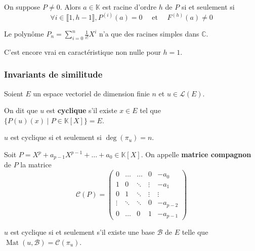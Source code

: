 	
	\begin{corollary}
		On suppose $P \neq 0$. Alors $a \in \mathbb{K}$ est racine d'ordre $h$ de $P$ si et seulement si
		\[ \forall i \in \llbracket 1, h-1 \rrbracket, P^{(i)}(a) = 0 \quad \text{ et } \quad F^{(h)}(a) \neq 0 \]
	\end{corollary}
	
	\begin{example}
		Le polynôme $P_n = \sum_{i=0}^{n} \frac{1}{i!} X^{i}$ n'a que des racines simples dans $\mathbb{C}$.
	\end{example}
	
	\begin{remark}
		C'est encore vrai en caractéristique non nulle pour $h = 1$.
	\end{remark}
	
	\subsubsection{Invariants de similitude}
	
	
	Soient $E$ un espace vectoriel de dimension finie $n$ et $u \in \mathcal{L}(E)$.
	
	\begin{definition}
		On dit que $u$ est \textbf{cyclique} s'il existe $x \in E$ tel que $\{ P(u)(x) \mid P \in \mathbb{K}[X] \} = E$.
	\end{definition}
	
	\begin{proposition}
		$u$ est cyclique si et seulement si $\deg(\pi_u) = n$.
	\end{proposition}
	
	\begin{definition}
		Soit $P = X^p + a_{p-1} X^{p-1} + \dots + a_0 \in \mathbb{K}[X]$. On appelle \textbf{matrice compagnon} de $P$ la matrice
		\[ \mathcal{C}(P) = \begin{pmatrix} 0 & \dots & \dots & 0 & -a_0 \\ 1 & 0 & \ddots & \vdots & -a_1 \\ 0 & 1 & \ddots & \vdots & \vdots \\ \vdots & \ddots & \ddots & 0 & -a_{p-2} \\ 0 & \dots & 0 & 1 & -a_{p-1} \end{pmatrix} \]
	\end{definition}
	
	\begin{proposition}
		$u$ est cyclique si et seulement s'il existe une base $\mathcal{B}$ de $E$ telle que $\operatorname{Mat}(u, \mathcal{B}) = \mathcal{C}(\pi_u)$.
	\end{proposition}
	

